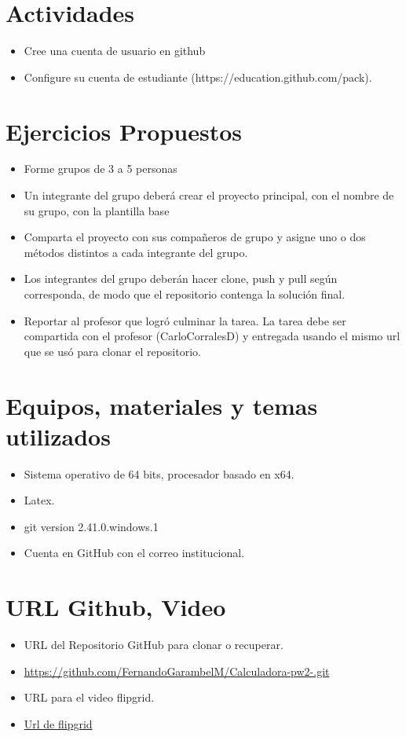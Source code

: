 \documentclass{article}
\begin{document}
	\section{Actividades}
	\begin{itemize}		
		\item Cree una cuenta de usuario en github
		\item Configure su cuenta de estudiante (https://education.github.com/pack).
	\end{itemize}
\section{Ejercicios Propuestos}
	\begin{itemize}		
		\item Forme grupos de 3 a 5 personas
		\item Un integrante del grupo deberá crear el proyecto principal, con el nombre de su grupo, con la plantilla base
		\item Comparta el proyecto con sus compañeros de grupo y asigne uno o dos  métodos distintos a cada integrante del grupo.
		\item Los integrantes del grupo deberán hacer clone, push y pull según corresponda, de modo que el repositorio contenga la solución final.
		\item Reportar al profesor que logró culminar la tarea. La tarea debe ser compartida con el profesor (CarloCorralesD) y entregada usando el mismo url que se usó para clonar el repositorio.
	\end{itemize}

	\section{Equipos, materiales y temas utilizados}
	\begin{itemize}
		\item Sistema operativo de 64 bits, procesador basado en x64.
		\item Latex. 
		\item git version 2.41.0.windows.1
		\item Cuenta en GitHub con el correo institucional.
	\end{itemize}
	\section{URL Github, Video}
	\begin{itemize}
		\item URL del Repositorio GitHub para clonar o recuperar.
		\item \url{https://github.com/FernandoGarambelM/Calculadora-pw2-.git}
		\item URL para el video flipgrid.
		\item \url{Url de flipgrid}	
	\end{itemize}
	\clearpage
\end{document}
